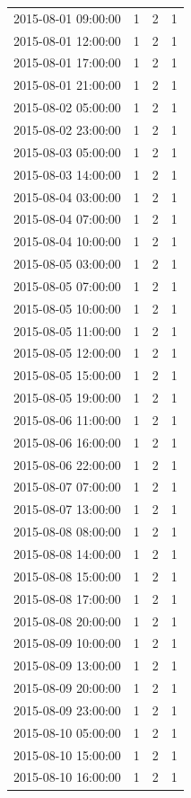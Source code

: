 \begin{tabular}{lrrr}
2015-08-01 09:00:00 & 1 & 2 & 1 \\
2015-08-01 12:00:00 & 1 & 2 & 1 \\
2015-08-01 17:00:00 & 1 & 2 & 1 \\
2015-08-01 21:00:00 & 1 & 2 & 1 \\
2015-08-02 05:00:00 & 1 & 2 & 1 \\
2015-08-02 23:00:00 & 1 & 2 & 1 \\
2015-08-03 05:00:00 & 1 & 2 & 1 \\
2015-08-03 14:00:00 & 1 & 2 & 1 \\
2015-08-04 03:00:00 & 1 & 2 & 1 \\
2015-08-04 07:00:00 & 1 & 2 & 1 \\
2015-08-04 10:00:00 & 1 & 2 & 1 \\
2015-08-05 03:00:00 & 1 & 2 & 1 \\
2015-08-05 07:00:00 & 1 & 2 & 1 \\
2015-08-05 10:00:00 & 1 & 2 & 1 \\
2015-08-05 11:00:00 & 1 & 2 & 1 \\
2015-08-05 12:00:00 & 1 & 2 & 1 \\
2015-08-05 15:00:00 & 1 & 2 & 1 \\
2015-08-05 19:00:00 & 1 & 2 & 1 \\
2015-08-06 11:00:00 & 1 & 2 & 1 \\
2015-08-06 16:00:00 & 1 & 2 & 1 \\
2015-08-06 22:00:00 & 1 & 2 & 1 \\
2015-08-07 07:00:00 & 1 & 2 & 1 \\
2015-08-07 13:00:00 & 1 & 2 & 1 \\
2015-08-08 08:00:00 & 1 & 2 & 1 \\
2015-08-08 14:00:00 & 1 & 2 & 1 \\
2015-08-08 15:00:00 & 1 & 2 & 1 \\
2015-08-08 17:00:00 & 1 & 2 & 1 \\
2015-08-08 20:00:00 & 1 & 2 & 1 \\
2015-08-09 10:00:00 & 1 & 2 & 1 \\
2015-08-09 13:00:00 & 1 & 2 & 1 \\
2015-08-09 20:00:00 & 1 & 2 & 1 \\
2015-08-09 23:00:00 & 1 & 2 & 1 \\
2015-08-10 05:00:00 & 1 & 2 & 1 \\
2015-08-10 15:00:00 & 1 & 2 & 1 \\
2015-08-10 16:00:00 & 1 & 2 & 1 \\

\end{tabular}
